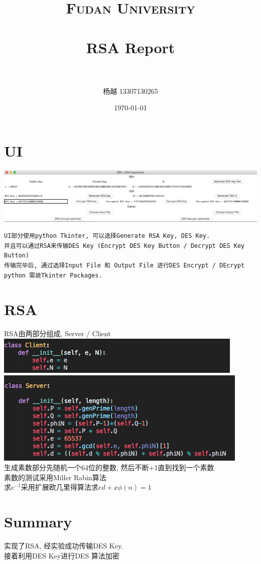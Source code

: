 \documentclass[paper=a4, fontsize=11pt]{scrartcl} %
\title{	
\normalfont \normalsize 
\textsc{Fudan University} \\ [25pt] %
\horrule{0.5pt} \\[0.4cm] %
\huge RSA Report\\ %
\horrule{2pt} \\[0.5cm] %
}
\author{杨越 13307130265} %
\date{\normalsize\today} %
\numberwithin{equation}{section} %
\numberwithin{figure}{section} %
\numberwithin{table}{section} %
\begin{document}
\maketitle %

\section{UI}
\includegraphics[scale=0.35]{pic/1.png}
\begin{lstlisting}
UI部分使用python Tkinter, 可以选择Generate RSA Key, DES Key.
并且可以通过RSA来传输DES Key (Encrypt DES Key Button / Decrypt DES Key Button)
传输完毕后, 通过选择Input File 和 Output File 进行DES Encrypt / DEcrypt
python 需装Tkinter Packages.
\end{lstlisting}
\newpage
\section{RSA}
RSA由两部分组成, Server / Client\\
\includegraphics[scale=0.7]{pic/2.png}\\
\includegraphics[scale=0.7]{pic/3.png}\\
生成素数部分先随机一个64位的整数, 然后不断+1直到找到一个素数\\
素数的测试采用Miller Rabin算法\\
求$e^{-1}$采用扩展欧几里得算法求$ed + x\phi(n) = 1$\\

\newpage
\section{Summary}
实现了RSA, 经实验成功传输DES Key.\\
接着利用DES Key进行DES 算法加密
\end{document}
